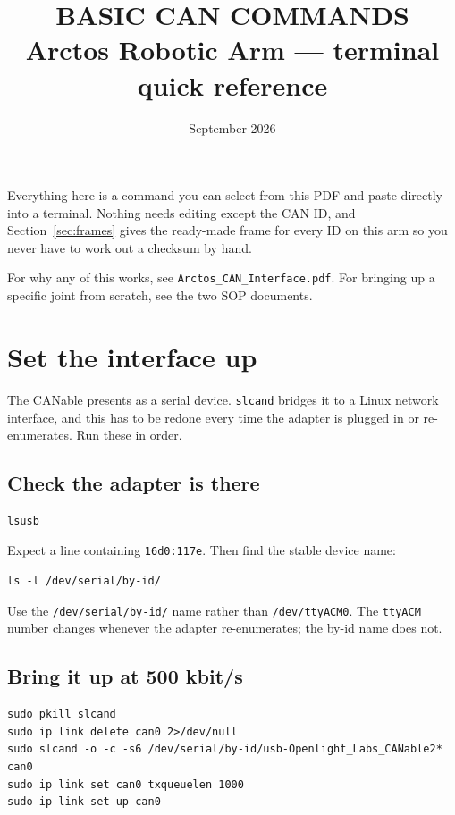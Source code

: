\documentclass[11pt,letterpaper]{article}
\title{BASIC CAN COMMANDS \\ \large Arctos Robotic Arm --- terminal quick reference}
\date{September 2026}
\begin{document}
\maketitle

Everything here is a command you can select from this PDF and paste directly into
a terminal. Nothing needs editing except the CAN ID, and Section~\ref{sec:frames}
gives the ready-made frame for every ID on this arm so you never have to work out
a checksum by hand.

For why any of this works, see \texttt{Arctos\_CAN\_Interface.pdf}. For bringing up
a specific joint from scratch, see the two SOP documents.

\tableofcontents
\newpage

\section{Set the interface up}

The CANable presents as a serial device. \texttt{slcand} bridges it to a Linux
network interface, and this has to be redone every time the adapter is plugged in
or re-enumerates. Run these in order.

\subsection{Check the adapter is there}
\begin{lstlisting}
lsusb
\end{lstlisting}

Expect a line containing \texttt{16d0:117e}. Then find the stable device name:

\begin{lstlisting}
ls -l /dev/serial/by-id/
\end{lstlisting}

Use the \texttt{/dev/serial/by-id/} name rather than \texttt{/dev/ttyACM0}. The
\texttt{ttyACM} number changes whenever the adapter re-enumerates; the by-id name
does not.

\subsection{Bring it up at 500 kbit/s}
\begin{lstlisting}
sudo pkill slcand
sudo ip link delete can0 2>/dev/null
sudo slcand -o -c -s6 /dev/serial/by-id/usb-Openlight_Labs_CANable2* can0
sudo ip link set can0 txqueuelen 1000
sudo ip link set up can0
\end{lstlisting}
\end{document}
